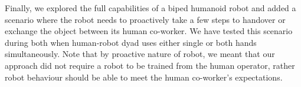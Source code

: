 Finally, we explored the full capabilities of a biped humanoid robot and added a scenario where the robot needs to proactively take a few steps to handover or exchange the object between its human co-worker. We have tested this scenario during both when human-robot dyad uses either single or both hands simultaneously. Note that by proactive nature of robot, we meant that our approach did not require a robot to be trained from the human operator, rather robot behaviour should be able to meet the human co-worker's expectations.


\clearpage
